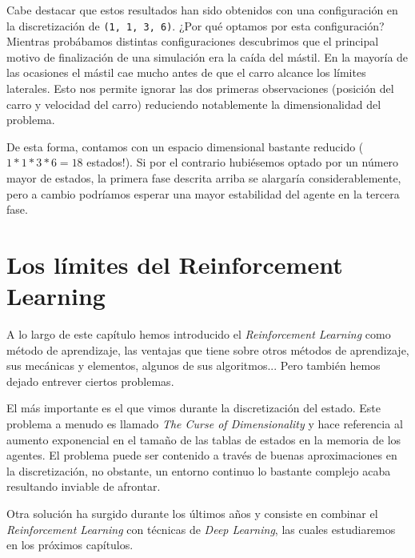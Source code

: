 Cabe destacar que estos resultados han sido obtenidos con una configuración en la discretización de \texttt{(1, 1, 3, 6)}. ¿Por qué optamos por esta configuración? Mientras probábamos distintas configuraciones descubrimos que el principal motivo de finalización de una simulación era la caída del mástil. En la mayoría de las ocasiones el mástil cae mucho antes de que el carro alcance los límites laterales. Esto nos permite ignorar las dos primeras observaciones (posición del carro y velocidad del carro) reduciendo notablemente la dimensionalidad del problema.

De esta forma, contamos con un espacio dimensional bastante reducido ($1*1*3*6=18$ estados!). Si por el contrario hubiésemos optado por un número mayor de estados, la primera fase descrita arriba se alargaría considerablemente, pero a cambio podríamos esperar una mayor estabilidad del agente en la tercera fase.

\section{Los límites del Reinforcement Learning}
A lo largo de este capítulo hemos introducido el \textit{Reinforcement Learning} como método de aprendizaje, las ventajas que tiene sobre otros métodos de aprendizaje, sus mecánicas y elementos, algunos de sus algoritmos... Pero también hemos dejado entrever ciertos problemas.

El más importante es el que vimos durante la discretización del estado. Este problema a menudo es llamado \textit{The Curse of Dimensionality} y hace referencia al aumento exponencial en el tamaño de las tablas de estados en la memoria de los agentes. El problema puede ser contenido a través de buenas aproximaciones en la discretización, no obstante, un entorno continuo lo bastante complejo acaba resultando inviable de afrontar.

Otra solución ha surgido durante los últimos años y consiste en combinar el \textit{Reinforcement Learning} con técnicas de \textit{Deep Learning}, las cuales estudiaremos en los próximos capítulos.